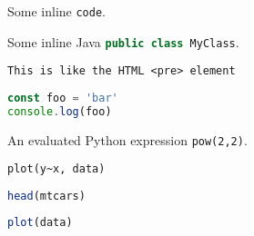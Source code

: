 %
%
%

Some inline \verb|code|.

Some inline Java \lstinline[language=Java]{public class MyClass}.

\begin{verbatim}
This is like the HTML <pre> element
\end{verbatim}

\begin{lstlisting}[language=js]
const foo = 'bar'
console.log(foo)
\end{lstlisting}


An evaluated Python expression \lstinline[language=python exec]{pow(2,2)}.

\begin{lstlisting}[language=r exec]
plot(y~x, data)
\end{lstlisting}

\begin{lstlisting}[language=r, exec]
head(mtcars)
\end{lstlisting}

\begin{lstlisting}[language=r, exec, caption={
    A plot of the data which has a mean of \lstinline[language=r exec]{ mean(data) }
}, label=fig2]
plot(data)
\end{lstlisting}
